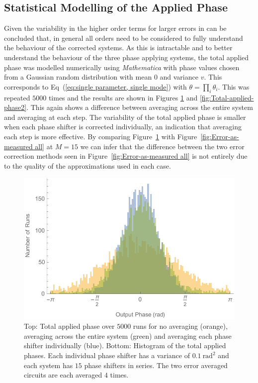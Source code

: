 \documentclass[aps,pra,twocolumn,superscriptaddress,numerical,floatfix]{revtex4-1}
\begin{document}


\subsection{Statistical Modelling of the Applied Phase\label{Statistical Modelling of the Applied Phase}}

Given the variability in the higher order terms for larger errors in can be concluded that, in general all orders need to be considered to fully understand the behaviour of the corrected systems. As this is intractable and to better understand the behaviour of the three phase applying systems, the total applied phase was modelled numerically using \textit{Mathematica} with phase values chosen from a Gaussian random distribution with mean $0$ and variance $v$. This corresponds to Eq~(\ref{eq:single parameter, single mode}) with $\theta=\prod_{i}\theta_{i}$. This was repeated $5000$ times and the results are shown in Figures \ref{fig:Total-applied-phase1} and \ref{fig:Total-applied-phase2}. This again shows a difference between averaging across the entire system and averaging at each step. The variability of the total applied phase is smaller when each phase shifter is corrected individually, an indication that averaging each step is more effective. By comparing Figure~\ref{fig:Total-applied-phase1} with Figure~\ref{fig:Error-as-measured all} at $M=15$ we can infer that the difference between the two error correction methods seen in Figure~\ref{fig:Error-as-measured all} is not entirely due to the quality of the approximations used in each case.
%
\begin{figure}
\centerline{\includegraphics[width=\columnwidth]{totphase1.pdf}}
\caption{Top: Total applied phase over $5000$ runs for no averaging (orange), averaging across the entire system (green) and averaging each phase shifter individually (blue). Bottom: Histogram of the total applied phases. Each individual phase shifter has a variance of $0.1\ \textrm{rad}^{2}$ and each system has $15$ phase shifters in series. The two error averaged circuits are each averaged $4$ times. \label{fig:Total-applied-phase1}}
\end{figure}
\end{document}
